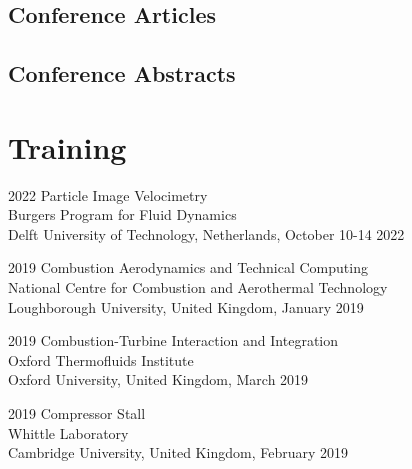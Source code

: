 \documentclass[12pt,letterpaper]{report}
\begin{document}
    \subsection*{Conference Articles}
        \nocite{*}
        \printbibliography[type=inproceedings,heading=none,resetnumbers]

     \subsection*{Conference Abstracts}
        \nocite{*}
        \printbibliography[type=abstract,heading=none,resetnumbers]
    
    
       	
    \section*{Training}
    
	\begin{tablist}
	
	\item[2022] \tab{}Particle Image Velocimetry \\ 
	Burgers Program for Fluid Dynamics \\
	Delft University of Technology, Netherlands, October 10-14 2022 
	
	\item[2019] \tab{}Combustion Aerodynamics and Technical Computing \\
	National Centre for Combustion and Aerothermal Technology \\
	Loughborough University, United Kingdom, January 2019
	
	\item[2019] \tab{}Combustion-Turbine Interaction and Integration \\ 
	Oxford Thermofluids Institute \\
	Oxford University, United Kingdom, March 2019
	
	\item[2019] \tab{}Compressor Stall \\ 
	Whittle Laboratory \\
	Cambridge University, United Kingdom, February 2019
	
	
	\end{tablist}


    
    
\end{document}
